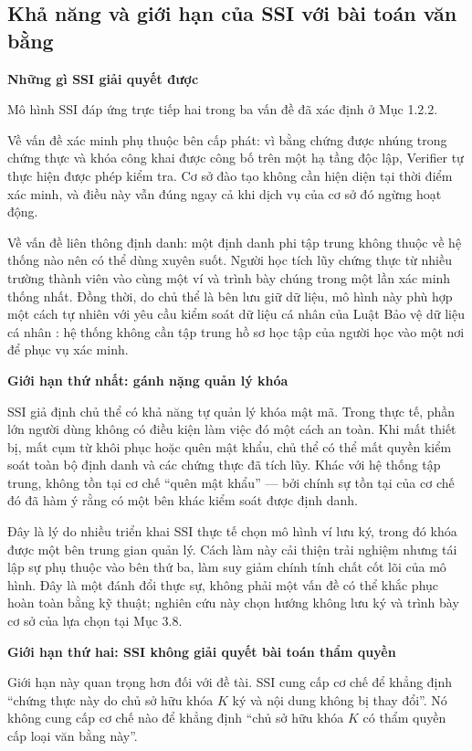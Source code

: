 \subsection{Khả năng và giới hạn của SSI với bài toán văn bằng}

\noindent \textbf{Những gì SSI giải quyết được}

Mô hình SSI đáp ứng trực tiếp hai trong ba vấn đề đã xác định ở Mục 1.2.2.

Về vấn đề xác minh phụ thuộc bên cấp phát: vì bằng chứng được nhúng trong chứng thực và khóa công khai được công bố trên một hạ tầng độc lập, Verifier tự thực hiện được phép kiểm tra. Cơ sở đào tạo không cần hiện diện tại thời điểm xác minh, và điều này vẫn đúng ngay cả khi dịch vụ của cơ sở đó ngừng hoạt động.

Về vấn đề liên thông định danh: một định danh phi tập trung không thuộc về hệ thống nào nên có thể dùng xuyên suốt. Người học tích lũy chứng thực từ nhiều trường thành viên vào cùng một ví và trình bày chúng trong một lần xác minh thống nhất. Đồng thời, do chủ thể là bên lưu giữ dữ liệu, mô hình này phù hợp một cách tự nhiên với yêu cầu kiểm soát dữ liệu cá nhân của Luật Bảo vệ dữ liệu cá nhân \cite{LuatBVDLCN2025}: hệ thống không cần tập trung hồ sơ học tập của người học vào một nơi để phục vụ xác minh.

\noindent \textbf{Giới hạn thứ nhất: gánh nặng quản lý khóa}

SSI giả định chủ thể có khả năng tự quản lý khóa mật mã. Trong thực tế, phần lớn người dùng không có điều kiện làm việc đó một cách an toàn. Khi mất thiết bị, mất cụm từ khôi phục hoặc quên mật khẩu, chủ thể có thể mất quyền kiểm soát toàn bộ định danh và các chứng thực đã tích lũy. Khác với hệ thống tập trung, không tồn tại cơ chế {``}quên mật khẩu{''} --- bởi chính sự tồn tại của cơ chế đó đã hàm ý rằng có một bên khác kiểm soát được định danh.

Đây là lý do nhiều triển khai SSI thực tế chọn mô hình ví lưu ký, trong đó khóa được một bên trung gian quản lý. Cách làm này cải thiện trải nghiệm nhưng tái lập sự phụ thuộc vào bên thứ ba, làm suy giảm chính tính chất cốt lõi của mô hình. Đây là một đánh đổi thực sự, không phải một vấn đề có thể khắc phục hoàn toàn bằng kỹ thuật; nghiên cứu này chọn hướng không lưu ký và trình bày cơ sở của lựa chọn tại Mục 3.8.

\noindent \textbf{Giới hạn thứ hai: SSI không giải quyết bài toán thẩm quyền}

Giới hạn này quan trọng hơn đối với đề tài. SSI cung cấp cơ chế để khẳng định {``}chứng thực này do chủ sở hữu khóa $K$ ký và nội dung không bị thay đổi{''}. Nó không cung cấp cơ chế nào để khẳng định {``}chủ sở hữu khóa $K$ có thẩm quyền cấp loại văn bằng này{''}.

